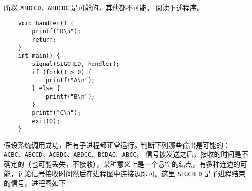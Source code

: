 \begin{problems}
\begin{figure}[H]
        \end{figure}
        所以 \verb|ABBCCD|、\verb|ABBCDC| 是可能的，其他都不可能。
        \pro 阅读下述程序。
        \begin{verbatim}
    void handler() {
        printf("D\n");
        return;
    }
    int main() {
        signal(SIGCHLD, handler);
        if (fork() > 0) {
            printf("A\n");
        } else {
            printf("B\n");
        } 
        printf("C\n");
        exit(0);
    }
        \end{verbatim}
        假设系统调用成功，所有子进程都正常运行。判断下列哪些输出是可能的：\verb|ACBC|、\verb|ABCCD|、\verb|ACBDC|、\verb|ABDCC|、\verb|BCDAC|、\verb|ABCC|。
        \sol 信号被发送之后，接收的时间是不确定的（也可能丢失，不接收），某种意义上是一个悬空的结点，有多种连边的可能，讨论信号接收时间然后在进程图中连接边即可。这里 \verb|SIGCHLD| 是子进程结束的信号，进程图如下：
        \begin{figure}[H]
            \small
            \tt
            \centering
\end{figure}
\end{problems}
